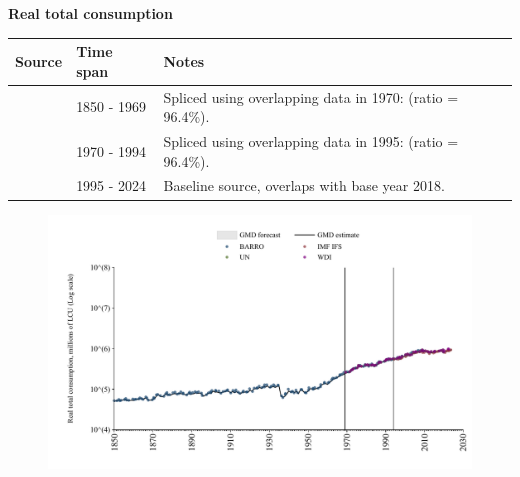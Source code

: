 \documentclass[12pt,a4paper,landscape]{article}
\begin{document}
\begin{adjustbox}{max totalsize={\paperwidth}{\paperheight},center}
\begin{minipage}[t][\textheight][t]{\textwidth}
\vspace*{0.5cm}
{}
\begin{center}
{\Large\bfseries Real total consumption}
\end{center}
\vspace{0.5cm}
\begin{table}[H]
\centering
\small
\begin{tabular}{|l|l|l|}
\hline
\textbf{Source} & \textbf{Time span} & \textbf{Notes} \\
\hline
\rowcolor{white}\cite{BARRO}& 1850 - 1969 &Spliced using overlapping data in 1970: (ratio = 96.4\%). \\
\rowcolor{lightgray}\cite{WDI}& 1970 - 1994 &Spliced using overlapping data in 1995: (ratio = 96.4\%). \\
\rowcolor{white}\cite{IMF_IFS}& 1995 - 2024 &Baseline source, overlaps with base year 2018. \\
\hline
\end{tabular}
\end{table}
\begin{figure}[H]
\centering
\includegraphics[width=\textwidth,height=0.6\textheight,keepaspectratio]{graphs/ESP_rcons.pdf}
\end{figure}
\end{minipage}
\end{adjustbox}
\end{document}
